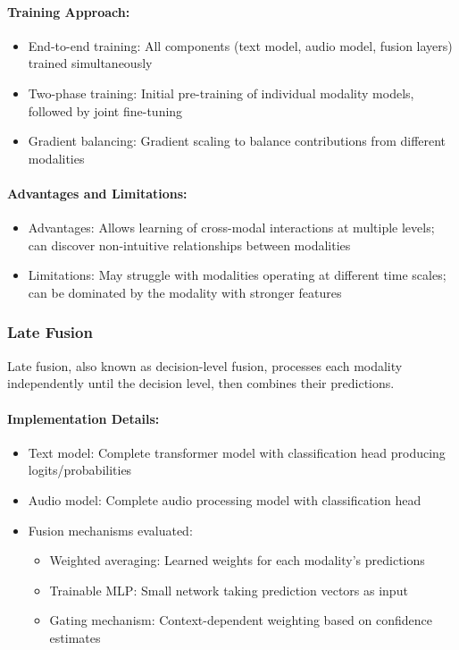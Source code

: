 \documentclass[12pt]{article}
\begin{document}
\paragraph{Training Approach:}
\begin{itemize}
    \item End-to-end training: All components (text model, audio model, fusion layers) trained simultaneously
    \item Two-phase training: Initial pre-training of individual modality models, followed by joint fine-tuning
    \item Gradient balancing: Gradient scaling to balance contributions from different modalities
\end{itemize}

\paragraph{Advantages and Limitations:}
\begin{itemize}
    \item Advantages: Allows learning of cross-modal interactions at multiple levels; can discover non-intuitive relationships between modalities
    \item Limitations: May struggle with modalities operating at different time scales; can be dominated by the modality with stronger features
\end{itemize}

\subsubsection{Late Fusion}
Late fusion, also known as decision-level fusion, processes each modality independently until the decision level, then combines their predictions.

\paragraph{Implementation Details:}
\begin{itemize}
    \item Text model: Complete transformer model with classification head producing logits/probabilities
    \item Audio model: Complete audio processing model with classification head
    \item Fusion mechanisms evaluated:
    \begin{itemize}
        \item Weighted averaging: Learned weights for each modality's predictions
        \item Trainable MLP: Small network taking prediction vectors as input
        \item Gating mechanism: Context-dependent weighting based on confidence estimates
    \end{itemize}
\end{itemize}
\end{document}
